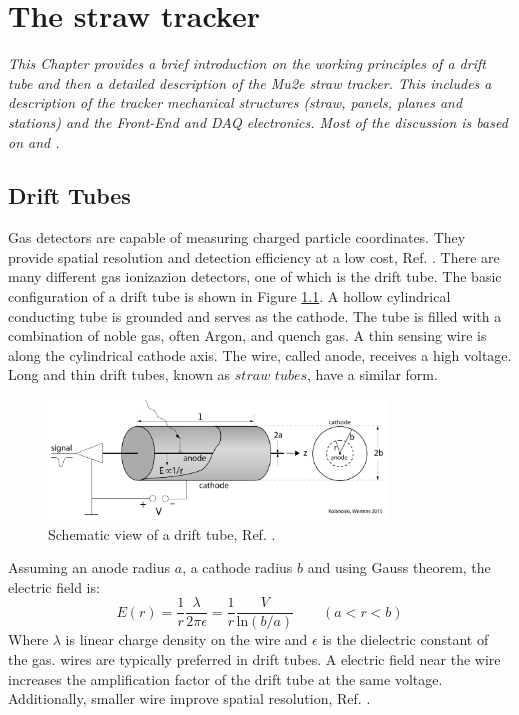 \chapter{The straw tracker}\label{chaptertrk}

\textit{This Chapter provides a brief introduction on the working principles 
of a drift tube and then a  detailed description of the Mu2e straw tracker. 
This includes a description of the tracker mechanical structures 
(straw, panels, planes and stations) and the Front-End and DAQ electronics. 
Most of the discussion is based on \cite{kola} and \cite{bobbb}.}

\section{Drift Tubes}
Gas detectors are capable of measuring charged particle coordinates. 
They provide  spatial resolution 
and  detection efficiency at a low cost, Ref. \cite{kola}. 
There are many different gas ionizazion detectors, one of which is the drift tube.
The basic configuration of a drift tube is shown in Figure \ref{fig:drifttube}.
A hollow cylindrical conducting tube is grounded and serves as the cathode.
The tube is filled with a combination of  noble gas, often Argon, and  quench gas. 
A thin sensing wire is  along the cylindrical cathode axis. 
The wire, called anode, receives a high voltage. Long and thin drift tubes,
known as $straw$ $tubes$, have a similar form.

\begin{figure}[!h]
    \centering
    \includegraphics[width =0.8\textwidth]{figures/png/Screenshot_20240324_232621.png}
    \caption[Schematic view of a drift tube.]{Schematic view of a drift tube, Ref. \cite{kola}.}
    \label{fig:drifttube}
    \end{figure}
Assuming an anode radius $a$, a cathode radius $b$ and using Gauss theorem, the electric field is:
\begin{equation}\label{avalanche}
    E(r)=\frac{1}{r}\frac{\lambda}{2\pi \epsilon}=\frac{1}{r}\frac{V}{ \text{ln}(b/a)} \qquad (a<r<b)
\end{equation}
Where $\lambda$ is linear charge density on the wire and $\epsilon$ is the dielectric constant of the gas.
 wires are typically preferred in drift tubes.
A  electric field near the wire increases the amplification factor 
of the drift tube at the same voltage. Additionally, smaller  wire
improve spatial resolution, Ref. \cite{kola}. 
